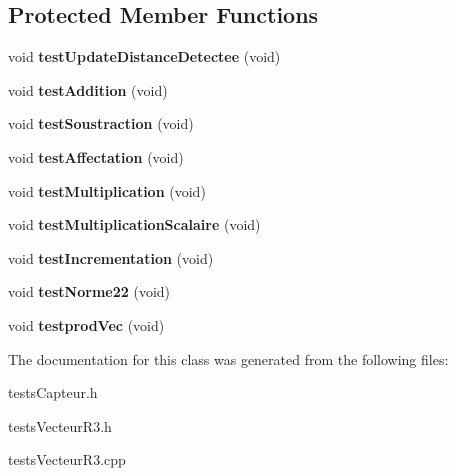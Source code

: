 \subsection*{Protected Member Functions}
\begin{DoxyCompactItemize}
\item 
\mbox{\label{classtests_vecteur_r3_a786fbbc93c959a6799e119f8bf0c842f}} 
void {\bfseries test\+Update\+Distance\+Detectee} (void)
\item 
\mbox{\label{classtests_vecteur_r3_af8144f37bd755b4508a9cf3e55c6a336}} 
void {\bfseries test\+Addition} (void)
\item 
\mbox{\label{classtests_vecteur_r3_a92455ad9ba84c67ef648ae6bbc58b39a}} 
void {\bfseries test\+Soustraction} (void)
\item 
\mbox{\label{classtests_vecteur_r3_ab0e8700f48f696f16b005c9d2b3c81c8}} 
void {\bfseries test\+Affectation} (void)
\item 
\mbox{\label{classtests_vecteur_r3_a792583229f3e781d80b8cb8a7cb1c7c9}} 
void {\bfseries test\+Multiplication} (void)
\item 
\mbox{\label{classtests_vecteur_r3_ad587375a8995dfa2c2f4975b6ce6561f}} 
void {\bfseries test\+Multiplication\+Scalaire} (void)
\item 
\mbox{\label{classtests_vecteur_r3_a031400fd6b09207d81c0ee045bfb3fed}} 
void {\bfseries test\+Incrementation} (void)
\item 
\mbox{\label{classtests_vecteur_r3_a1bdbc486011b693f5b9f52094ab5abe0}} 
void {\bfseries test\+Norme22} (void)
\item 
\mbox{\label{classtests_vecteur_r3_ad3141a4436113f0c43e0acbd661657b4}} 
void {\bfseries testprod\+Vec} (void)
\end{DoxyCompactItemize}


The documentation for this class was generated from the following files\+:\begin{DoxyCompactItemize}
\item 
tests\+Capteur.\+h\item 
tests\+Vecteur\+R3.\+h\item 
tests\+Vecteur\+R3.\+cpp\end{DoxyCompactItemize}
